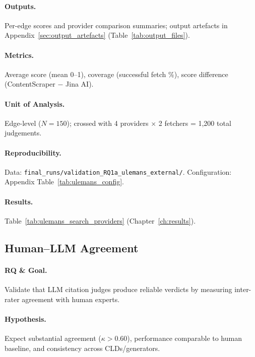 \paragraph{Outputs.}
Per-edge scores and provider comparison summaries; output artefacts in Appendix~\ref{sec:output_artefacts} (Table~\ref{tab:output_files}).

\paragraph{Metrics.}
Average score (mean 0--1), coverage (successful fetch \%), score difference (ContentScraper $-$ Jina AI).

\paragraph{Unit of Analysis.}
Edge-level ($N=150$); crossed with 4 providers $\times$ 2 fetchers = 1,200 total judgements.

\paragraph{Reproducibility.}
Data: \texttt{final\_runs/validation\_RQ1a\_ulemans\_external/}. Configuration: Appendix Table~\ref{tab:ulemans_config}.

\paragraph{Results.}
Table~\ref{tab:ulemans_search_providers} (Chapter~\ref{ch:results}).

\subsection{Human--LLM Agreement}
\label{sec:human_llm_agreement}

\paragraph{RQ \& Goal.}
Validate that LLM citation judges produce reliable verdicts by measuring inter-rater agreement with human experts.

\paragraph{Hypothesis.}
Expect substantial agreement ($\kappa > 0.60$), performance comparable to human baseline, and consistency across CLDs/generators.

